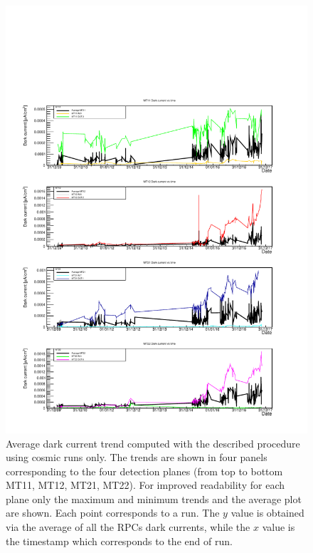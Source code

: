 \begin{figure}[!t]
\begin{center}
\includegraphics[width=0.95\linewidth]{Chapters/Performance/Figs/iDark_COSMIC_minmax.pdf}
\caption{Average dark current trend computed with the described procedure using cosmic runs only. The trends are shown in four panels corresponding to the four detection planes (from top to bottom MT11, MT12, MT21, MT22). For improved readability for each plane only the maximum and minimum trends and the average plot are shown. Each point corresponds to a run. The $y$ value is obtained via the average of all the RPCs dark currents, while the $x$ value is the timestamp which corresponds to the end of run.}
\label{fig:iDarkCOSMIC}
\end{center}
\end{figure}


